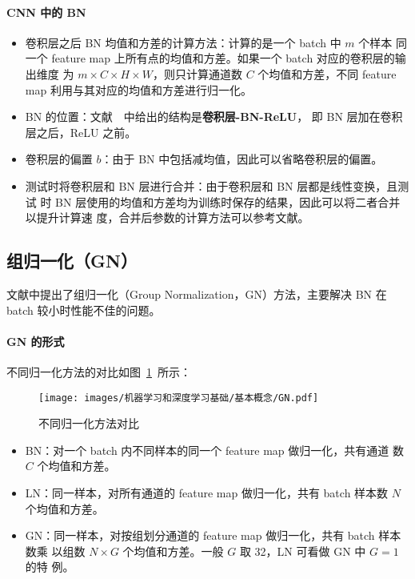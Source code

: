 \paragraph{CNN 中的 BN}
\begin{itemize}
  \item 卷积层之后 BN 均值和方差的计算方法：计算的是一个 batch 中 $m$ 个样本
    同一个 feature map 上所有点的均值和方差。如果一个 batch 对应的卷积层的输出维度
    为 $m \times C \times H \times W$，则只计算通道数 $C$ 个均值和方差，不同
    feature map 利用与其对应的均值和方差进行归一化。
  \item BN 的位置：文献~~中给出的结构是\textbf{卷积层-BN-ReLU}，
    即 BN 层加在卷积层之后，ReLU 之前。
  \item 卷积层的偏置 $b$：由于 BN 中包括减均值，因此可以省略卷积层的偏置。
  \item 测试时将卷积层和 BN 层进行合并：由于卷积层和 BN 层都是线性变换，且测试
    时 BN 层使用的均值和方差均为训练时保存的结果，因此可以将二者合并以提升计算速
    度，合并后参数的计算方法可以参考文献。
\end{itemize}

\subsection{组归一化（GN）}\label{sub:GN}

文献中提出了组归一化（Group Normalization，GN）方法，主要解决 BN
在 batch 较小时性能不佳的问题。

\paragraph{GN 的形式}
不同归一化方法的对比如图~\ref{fig:all-norm}~所示：
\begin{figure}[ht]
  \centering
  \texttt{[image: images/机器学习和深度学习基础/基本概念/GN.pdf]}
  \caption{不同归一化方法对比}\label{fig:all-norm}
\end{figure}

\begin{itemize}
  \item BN：对一个 batch 内不同样本的同一个 feature map 做归一化，共有通道
    数 $C$ 个均值和方差。
  \item LN：同一样本，对所有通道的 feature map 做归一化，共有 batch 样本数 $N$
    个均值和方差。
  \item GN：同一样本，对按组划分通道的 feature map 做归一化，共有 batch 样本数乘
    以组数 $N \times G$ 个均值和方差。一般 $G$ 取 32，LN 可看做 GN 中 $G=1$ 的特
    例。
\end{itemize}

